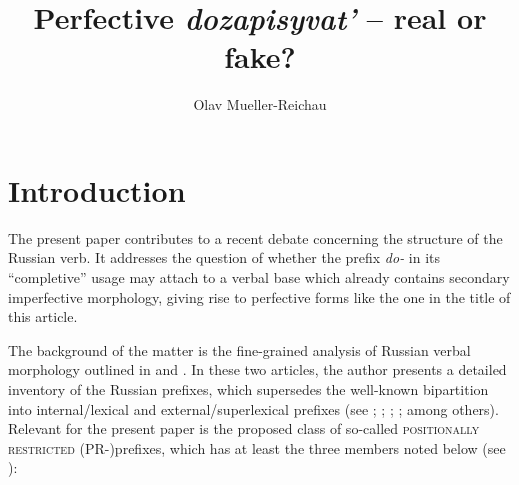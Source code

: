 \documentclass[output=paper,
colorlinks,
citecolor=brown,
newtxmath
]{langscibook}
\author{Olav Mueller-Reichau\affiliation{Leipzig University}}
\title{Perfective \textit{dozapisyvat'} -- real or fake?}
\begin{document}
\maketitle


\section{Introduction}

The present paper contributes to a recent debate concerning the structure of the Russian verb. It addresses the question of whether the prefix \textit{do-} in its ``completive'' usage may attach to a verbal base which already contains secondary imperfective morphology, giving rise to perfective forms like the one in the title of this article.

The background of the matter is the fine-grained analysis of Russian verbal morphology outlined in \citet{Tatevosov2009} and \citet{Tatevosov2013b}. In these two articles, the author presents a detailed inventory of the Russian prefixes, which supersedes the well-known bipartition into internal/lexical and external/super\-lexical pre\-fixes (see \citealt{Gehrke2008}; \citealt{Ramchand2004}; \citealt{Romanova2004}; \citealt{Svenonius2004}; among others). Relevant for the present paper is the proposed class of so-called \textsc{positionally restricted} (PR-)prefixes, which has at least the three members noted below (see \citealt[49]{Tatevosov2013b}):
\end{document}
